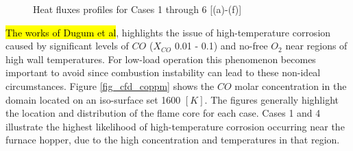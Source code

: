 \documentclass[twocolumn,10pt]{asme2ej}
\begin{document}
\begin{figure}[h!]
\hspace{10mm}
\hspace{10mm}
\caption{Heat fluxes profiles for Cases 1 through 6 [(a)-(f)]}
\label{fig_cfd_heat_flux}
\end{figure}
\newpage
\hl{The works of Dugum et al}\cite{ugum2019}, highlights the issue of high-temperature corrosion caused by significant levels of $CO$ ($X_{CO}$ 0.01 - 0.1) and no-free $O_2$ near regions of high wall temperatures. For low-load operation this phenomenon becomes important to avoid since combustion instability can lead to these non-ideal circumstances. Figure \ref{fig_cfd_coppm} shows the $CO$ molar concentration in the domain located on an iso-surface set 1600 $[K]$. The figures generally highlight the location and distribution of the flame core for each case. Cases 1 and 4 illustrate the highest likelihood of high-temperature corrosion occurring near the furnace hopper, due to the high concentration and temperatures in that region.\\
\end{document}

